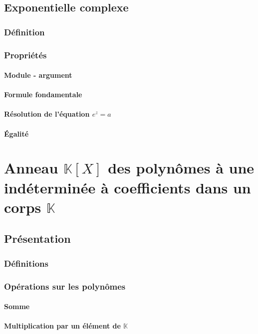 \documentclass[12pt,a4paper,french]{book}
\begin{document}
	\section{Exponentielle complexe}
		\subsection{Définition}
		\subsection{Propriétés}
			\subsubsection{Module - argument}
			\subsubsection{Formule fondamentale}
			\subsubsection{Résolution de l'équation $e^{z} = a$}
			\subsubsection{Égalité}
			
\chapter{Anneau $\mathbb{K}[X]$ des polynômes à une indéterminée à coefficients dans un corps $\mathbb{K}$}
	\section{Présentation}
		\subsection{Définitions}
		\subsection{Opérations sur les polynômes}
			\subsubsection{Somme}
			\subsubsection{Multiplication par un élément de $\mathbb{K}$}
\end{document}
